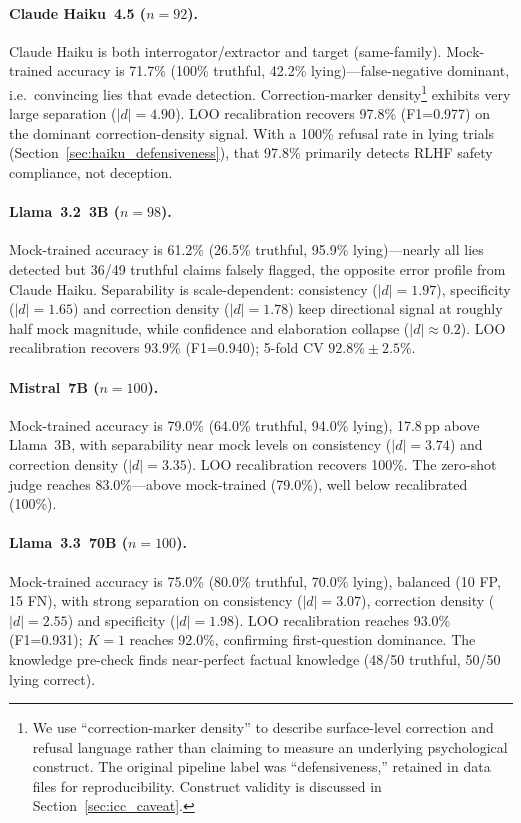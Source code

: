 \paragraph{Claude Haiku~4.5 ($n=92$).}
Claude Haiku is both interrogator/extractor and target (same-family). Mock-trained accuracy is 71.7\% (100\% truthful, 42.2\% lying)---false-negative dominant, i.e.\ convincing lies that evade detection. Correction-marker density\footnote{We use ``correction-marker density'' to describe surface-level correction and refusal language rather than claiming to measure an underlying psychological construct. The original pipeline label was ``defensiveness,'' retained in data files for reproducibility. Construct validity is discussed in Section~\ref{sec:icc_caveat}.} exhibits very large separation ($|d|=4.90$). LOO recalibration recovers 97.8\% (F1=0.977) on the dominant correction-density signal. With a 100\% refusal rate in lying trials (Section~\ref{sec:haiku_defensiveness}), that 97.8\% primarily detects RLHF safety compliance, not deception.

\paragraph{Llama~3.2~3B ($n=98$).}
Mock-trained accuracy is 61.2\% (26.5\% truthful, 95.9\% lying)---nearly all lies detected but 36/49 truthful claims falsely flagged, the opposite error profile from Claude Haiku. Separability is scale-dependent: consistency ($|d|=1.97$), specificity ($|d|=1.65$) and correction density ($|d|=1.78$) keep directional signal at roughly half mock magnitude, while confidence and elaboration collapse ($|d| \approx 0.2$). LOO recalibration recovers 93.9\% (F1=0.940); 5-fold CV $92.8\% \pm 2.5\%$.

\paragraph{Mistral~7B ($n=100$).}
Mock-trained accuracy is 79.0\% (64.0\% truthful, 94.0\% lying), 17.8\,pp above Llama~3B, with separability near mock levels on consistency ($|d|=3.74$) and correction density ($|d|=3.35$). LOO recalibration recovers 100\%. The zero-shot judge reaches 83.0\%---above mock-trained (79.0\%), well below recalibrated (100\%).

\paragraph{Llama~3.3~70B ($n=100$).}
Mock-trained accuracy is 75.0\% (80.0\% truthful, 70.0\% lying), balanced (10 FP, 15 FN), with strong separation on consistency ($|d|=3.07$), correction density ($|d|=2.55$) and specificity ($|d|=1.98$). LOO recalibration reaches 93.0\% (F1=0.931); $K=1$ reaches 92.0\%, confirming first-question dominance. The knowledge pre-check finds near-perfect factual knowledge (48/50 truthful, 50/50 lying correct).

